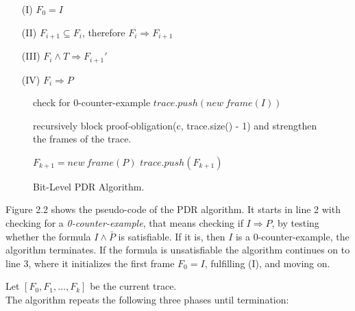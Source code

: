 \documentclass[11pt, a4paper, BCOR=10mm, ngerman]{scrbook}
\begin{document}
\begin{itemize}
\item[(I)] $F_0 = I$
\item[(II)] $F_{i+1} \subseteq F_{i}$, therefore $F_i \Rightarrow F_{i+1}$
\item[(III)] $F_i \land T \Rightarrow F_{i+1}'$
\item[(IV)] $F_i \Rightarrow P$
\end{itemize}


\begin{figure}[H]
	\begin{algorithm}[H] 
		\begin{algorithmic}[1]
			\State check for 0-counter-example
			\State $trace.push(new\ frame(I))$
			\Statex
			\Loop
			
			\State recursively block proof-obligation(c, trace.size() - 1)
			\State and strengthen the frames of the trace.
			
			 
			\EndIf
			\EndWhile
			
			\Statex 
			
			\State $F_{k+1} = new\ frame(P)$
			\EndIf
			\EndFor
			\EndIf
			\State $trace.push(F_{k+1})$
			
			\EndLoop
			\EndProcedure
		\end{algorithmic}
	\end{algorithm}
	\caption{Bit-Level PDR Algorithm.}
\end{figure}

Figure 2.2 shows the pseudo-code of the PDR algorithm. It starts in line 2 with checking for a \textsl{0-counter-example}, that means checking if $I \Rightarrow P$, by testing whether the formula $I \land \bar P$ is satisfiable. If it is, then $I$ is a 0-counter-example, the algorithm terminates.
If the formula is unsatisfiable the algorithm continues on to line 3, where it initializes the first frame $F_0 = I$, fulfilling (I), and moving on. \par

Let $[F_0, F_1, ..., F_k]$ be the current trace. \\ 
The algorithm repeats the following three phases until termination: \par
\end{document}
